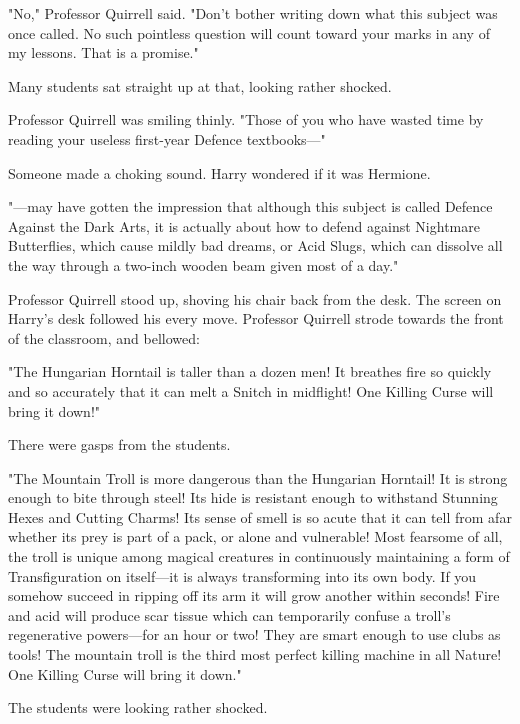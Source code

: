"No," Professor Quirrell said. "Don't bother writing down what this subject was 
once called. No such pointless question will count toward your marks in any of 
my lessons. That is a promise."

Many students sat straight up at that, looking rather shocked.

Professor Quirrell was smiling thinly. "Those of you who have wasted time by 
reading your useless first-year Defence textbooks---"

Someone made a choking sound. Harry wondered if it was Hermione.

"---may have gotten the impression that although this subject is called Defence 
Against the Dark Arts, it is actually about how to defend against Nightmare 
Butterflies, which cause mildly bad dreams, or Acid Slugs, which can dissolve 
all the way through a two-inch wooden beam given most of a day."

Professor Quirrell stood up, shoving his chair back from the desk. The screen 
on Harry's desk followed his every move. Professor Quirrell strode towards the 
front of the classroom, and bellowed:

"The Hungarian Horntail is taller than a dozen men! It breathes fire so quickly 
and so accurately that it can melt a Snitch in midflight! One Killing Curse 
will bring it down!"

There were gasps from the students.

"The Mountain Troll is more dangerous than the Hungarian Horntail! It is strong 
enough to bite through steel! Its hide is resistant enough to withstand 
Stunning Hexes and Cutting Charms! Its sense of smell is so acute that it can 
tell from afar whether its prey is part of a pack, or alone and vulnerable! 
Most fearsome of all, the troll is unique among magical creatures in 
continuously maintaining a form of Transfiguration on itself---it is always 
transforming into its own body. If you somehow succeed in ripping off its arm 
it will grow another within seconds! Fire and acid will produce scar tissue 
which can temporarily confuse a troll's regenerative powers---for an hour or 
two! They are smart enough to use clubs as tools! The mountain troll is the 
third most perfect killing machine in all Nature! One Killing Curse will bring 
it down."

The students were looking rather shocked.


